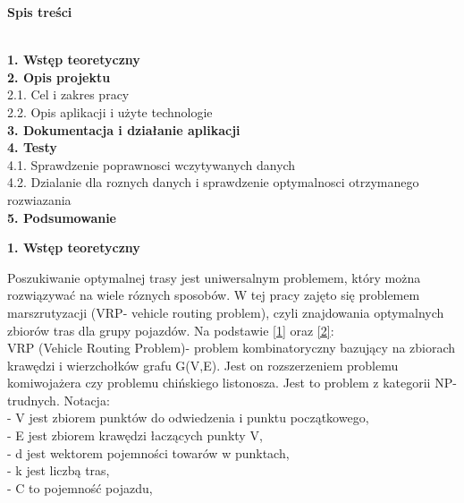 \documentclass[a4paper, twoside, 12pt, justified]{article}
\begin{document}
	\begin{flushleft}
		\begin{large}\textbf{Spis treści}\end{large}
		\textbf{
			\\1. Wstęp teoretyczny}\\
			\textbf{2. Opis projektu}\\
			\hspace{5mm}2.1. Cel i zakres pracy\\
			\hspace{5mm}2.2. Opis aplikacji i użyte technologie\\
			\textbf{3. Dokumentacja i działanie aplikacji}\\
			\textbf{4. Testy}\\
			\hspace{5mm}4.1. Sprawdzenie poprawnosci wczytywanych danych\\
			\hspace{5mm}4.2. Dzialanie dla roznych danych i sprawdzenie optymalnosci otrzymanego rozwiazania\\
			\textbf{5. Podsumowanie}\\
		
	\end{flushleft}
	\newpage
	
		
	\begin{large}\textbf{1. Wstęp teoretyczny}\end{large}
	\vspace{10mm} %
	
	\hspace{5mm}
	Poszukiwanie optymalnej trasy jest uniwersalnym problemem, który można rozwiązywać na wiele róznych sposobów. W tej pracy zajęto się problemem marszrutyzacji (VRP- vehicle routing problem), czyli znajdowania optymalnych zbiorów tras dla grupy pojazdów. Na podstawie \hyperlink{vrp}{[1]} oraz \hyperlink{cvrp}{[2]}:\\
	VRP (Vehicle Routing Problem)- problem kombinatoryczny bazujący na zbiorach krawędzi i wierzchołków grafu G(V,E). Jest on rozszerzeniem problemu komiwojażera czy problemu chińskiego listonosza. Jest to problem z kategorii NP- trudnych. Notacja: \\
	- V jest zbiorem punktów do odwiedzenia i punktu początkowego,\\
	- E jest zbiorem krawędzi łaczących punkty V,\\
	- d jest wektorem pojemności towarów w punktach,\\
	- k jest liczbą tras,\\
	- C to pojemność pojazdu,\\
	
\end{document}
